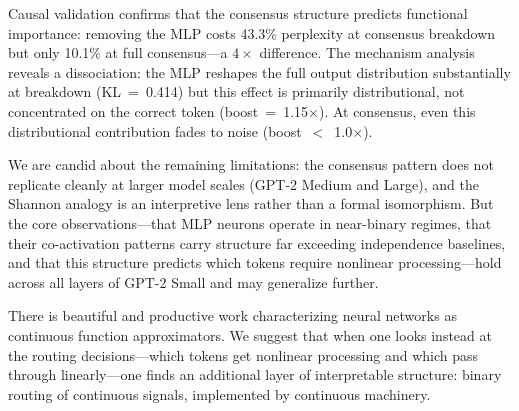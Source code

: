 \documentclass{article}
\begin{document}
Causal validation confirms that the consensus structure predicts functional importance:
removing the MLP costs 43.3\% perplexity at consensus breakdown but only
10.1\% at full consensus---a $4\times$ difference. The mechanism analysis reveals a
dissociation: the MLP reshapes the full output distribution substantially at breakdown
(KL~=~0.414) but this effect is primarily distributional, not concentrated on the correct
token (boost~=~1.15$\times$). At consensus, even this distributional contribution fades
to noise (boost~$<$~1.0$\times$).

We are candid about the remaining limitations: the consensus pattern does not replicate
cleanly at larger model scales (GPT-2 Medium and Large), and the Shannon analogy is an
interpretive lens rather than a formal isomorphism. But the core observations---that MLP
neurons operate in near-binary regimes, that their co-activation patterns carry structure
far exceeding independence baselines, and that this structure predicts which tokens require
nonlinear processing---hold across all layers of GPT-2 Small and may generalize further.

There is beautiful and productive work characterizing neural networks as continuous function
approximators. We suggest that when one looks instead at the routing decisions---which tokens
get nonlinear processing and which pass through linearly---one finds an additional layer of
interpretable structure: binary routing of continuous signals, implemented by continuous
machinery.



\end{document}
